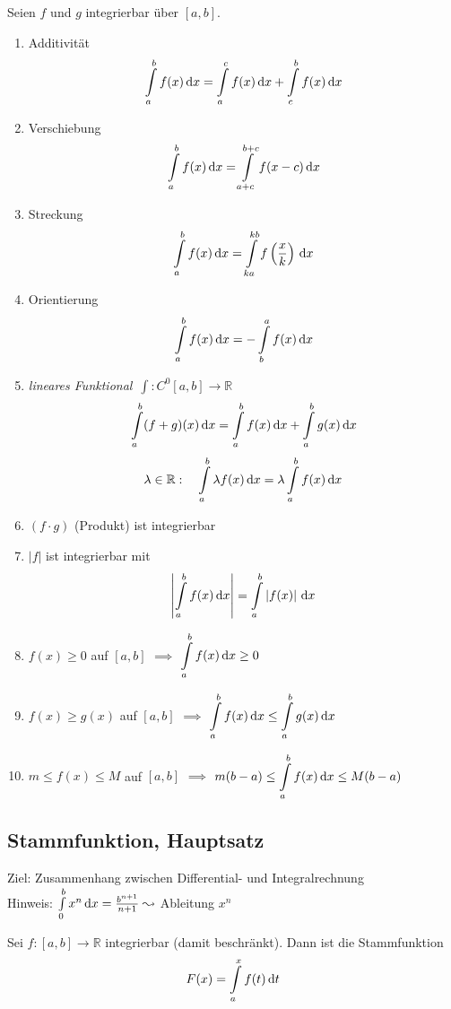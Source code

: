 
\begin{theorem}
  Seien $f$ und $g$ integrierbar über $[a,b]$.
  \begin{enumerate}
    \item Additivität \[ \int\limits_a^b f(x)\,\mathrm d x = \int\limits_a^c f(x)\,\mathrm d x + \int\limits_c^b f(x)\, \mathrm d x \]
    \item Verschiebung \[ \int\limits_a^b f(x)\,\mathrm d x = \int\limits_{a+c}^{b+c} f(x-c)\,\mathrm d x \]
    \item Streckung  \[ \int\limits_a^b f(x)\,\mathrm d x = \int\limits_{ka}^{kb} f\left(\frac x k\right)\,\mathrm d x \]
    \item Orientierung \[ \int\limits_a^b f(x)\,\mathrm d x = - \int\limits_b^a f(x)\,\mathrm d x \]
    \item \emph{lineares Funktional}\ $\int: C^0[a,b] \to \mathbb{R}$
      \[ \int\limits_a^b (f+g)(x)\,\mathrm d x = \int\limits_a^b f(x)\,\mathrm d x + \int\limits_a^b g(x)\,\mathrm d x \]
      \[ \lambda \in \mathbb{R}: \quad \int\limits_a^b \lambda f(x)\,\mathrm d x  = \lambda \int\limits_a^b f(x)\,\mathrm d x \]
    \item $(f \cdot g)$ (Produkt) ist integrierbar
    \item $\left| f \right|$ ist integrierbar mit
      \[ \left| \int\limits_a^b f(x)\,\mathrm d x\right| = \int\limits_a^b \left| f(x) \right| \,\mathrm d x \]
    \item $f(x) \geq 0$ auf $[a,b]$ $\implies$ $\displaystyle \int\limits_a^b f(x)\,\mathrm d x \geq 0$
    \item $f(x) \geq g(x)$ auf $[a,b]$ $\implies$ $\displaystyle \int\limits_a^b f(x)\,\mathrm d x \leq \int\limits_a^b g(x)\,\mathrm d x$
    \item $m \leq f(x) \leq M$ auf $[a,b]$ $\implies$ $\displaystyle m(b-a) \leq \int\limits_a^b f(x)\,\mathrm d x \leq M(b-a)$
  \end{enumerate}
\end{theorem}

\subsection{Stammfunktion, Hauptsatz}

Ziel: Zusammenhang zwischen Differential- und Integralrechnung\\
Hinweis: $\int\limits_0^b x^n\,\mathrm d x = \frac{b^{n+1}}{n+1} \leadsto$ Ableitung $x^n$

\begin{definition}[Stammfunktion $F$]
  Sei $f: [a,b] \to \mathbb{R}$ integrierbar (damit beschränkt). Dann ist die Stammfunktion
  \[ F(x) = \int\limits_a^x f(t)\,\mathrm d t \]
\end{definition}

